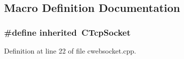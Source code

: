 \subsection{Macro Definition Documentation}
\subsubsection[{inherited}]{\setlength{\rightskip}{0pt plus 5cm}\#define inherited~C\-Tcp\-Socket}\label{cwebsocket_8cpp_a3920e3b7cb0909b941b2409493acf8f1}


Definition at line 22 of file cwebsocket.\-cpp.

